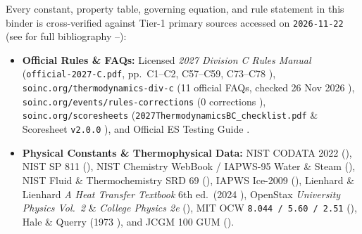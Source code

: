 \begin{shortcut}
Every constant, property table, governing equation, and rule statement in this binder is cross-verified against Tier-1 primary sources accessed on \texttt{2026-11-22} (see  for full bibliography --):
\begin{itemize}
  \item \textbf{Official Rules \& FAQs:} Licensed \emph{2027 Division C Rules Manual} (\texttt{official-2027-C.pdf}, pp.\ C1--C2, C57--C59, C73--C78 ), \texttt{soinc.org/thermodynamics-div-c} (11 official FAQs, checked 26 Nov 2026 ), \texttt{soinc.org/events/rules-corrections} (0 corrections ), \texttt{soinc.org/scoresheets} (\texttt{2027ThermodynamicsBC\_checklist.pdf} \& Scoresheet \texttt{v2.0.0} ), and Official ES Testing Guide .
  \item \textbf{Physical Constants \& Thermophysical Data:} NIST CODATA 2022 (), NIST SP 811 (), NIST Chemistry WebBook / IAPWS-95 Water \& Steam (), NIST Fluid \& Thermochemistry SRD 69 (), IAPWS Ice-2009 (), Lienhard \& Lienhard \emph{A Heat Transfer Textbook} 6th ed.\ (2024 ), OpenStax \emph{University Physics Vol.\ 2} \& \emph{College Physics 2e} (), MIT OCW \texttt{8.044 / 5.60 / 2.51} (), Hale \& Querry (1973 ), and JCGM 100 GUM ().
\end{itemize}
\end{shortcut}

